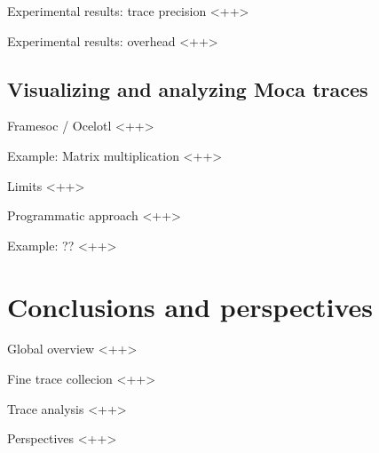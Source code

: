 \documentclass[xcolor={usenames,dvipsnames},hyperref={pdfusetitle}]{beamer}
\begin{document}
\begin{frame}{Experimental results: trace precision}
    <++>
\end{frame}

\begin{frame}{Experimental results: overhead}
    <++>
\end{frame}

\subsection{Visualizing and analyzing Moca traces}

\begin{frame}{Framesoc / Ocelotl}
    <++>
\end{frame}

\begin{frame}{Example: Matrix multiplication}
    <++>
\end{frame}

\begin{frame}{Limits}
    <++>
\end{frame}

\begin{frame}{Programmatic approach}
    <++>
\end{frame}

\begin{frame}{Example: ??}
    <++>
\end{frame}

\section{Conclusions and perspectives}

\begin{frame}{Global overview}
    \cite{Beniamine15TABARNAC}
    <++>
\end{frame}

\begin{frame}{Fine trace collecion}
    \cite{Beniamine16Moca}
    <++>
\end{frame}

\begin{frame}{Trace analysis}
    <++>
\end{frame}

\begin{frame}{Perspectives}
    <++>
\end{frame}

\setcounter{finalframe}{\value{framenumber}}
\end{document}
